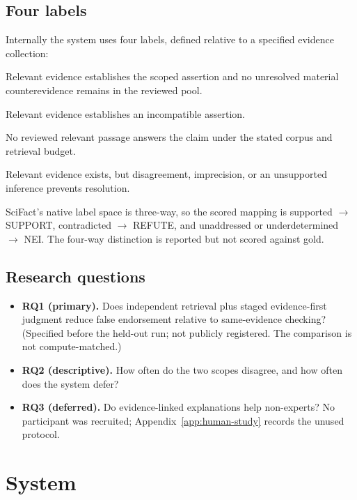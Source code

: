 \documentclass[11pt,a4paper]{article}
\begin{document}
\subsection{Four labels}

Internally the system uses four labels, defined relative to a specified
evidence collection:

\begin{description}[leftmargin=1.1em,style=nextline]
  \item[Supported] Relevant evidence establishes the scoped assertion and
    no unresolved material counterevidence remains in the reviewed pool.
  \item[Contradicted] Relevant evidence establishes an incompatible
    assertion.
  \item[Unaddressed] No reviewed relevant passage answers the claim under
    the stated corpus and retrieval budget.
  \item[Underdetermined] Relevant evidence exists, but disagreement,
    imprecision, or an unsupported inference prevents resolution.
\end{description}

SciFact's native label space is three-way, so the scored mapping is
supported $\to$ SUPPORT, contradicted $\to$ REFUTE, and unaddressed or
underdetermined $\to$ NEI. The four-way distinction is reported but not
scored against gold.

\subsection{Research questions}

\begin{itemize}
  \item \textbf{RQ1 (primary).} Does independent retrieval plus staged
    evidence-first judgment reduce false endorsement relative to
    same-evidence checking? (Specified before the held-out run; not
    publicly registered. The comparison is not compute-matched.)
  \item \textbf{RQ2 (descriptive).} How often do the two scopes disagree,
    and how often does the system defer?
  \item \textbf{RQ3 (deferred).} Do evidence-linked explanations help
    non-experts? No participant was recruited; Appendix~\ref{app:human-study}
    records the unused protocol.
\end{itemize}

\section{System}
\end{document}
